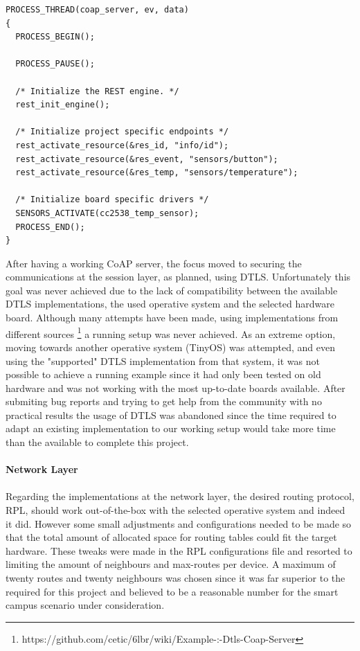\begin{lstlisting}[caption={CoAP Resources Activation}]
PROCESS_THREAD(coap_server, ev, data)
{
  PROCESS_BEGIN();

  PROCESS_PAUSE();

  /* Initialize the REST engine. */
  rest_init_engine();

  /* Initialize project specific endpoints */
  rest_activate_resource(&res_id, "info/id");
  rest_activate_resource(&res_event, "sensors/button");
  rest_activate_resource(&res_temp, "sensors/temperature");

  /* Initialize board specific drivers */
  SENSORS_ACTIVATE(cc2538_temp_sensor);
  PROCESS_END();
}
\end{lstlisting}

After having a working \gls{CoAP} server, the focus moved to securing the communications at the session layer, as planned, using \gls{DTLS}. Unfortunately this goal was never achieved due to the lack of compatibility between the available \gls{DTLS} implementations, the used operative system and the selected hardware board. Although many attempts have been made, using implementations from different sources \footnote{https://github.com/cetic/6lbr/wiki/Example-:-Dtls-Coap-Server} a running setup was never achieved. As an extreme option, moving towards another operative system (TinyOS) was attempted, and even using the "supported" \gls{DTLS} implementation from that system, it was not possible to achieve a running example since it had only been tested on old hardware and was not working with the most up-to-date boards available. After submiting bug reports and trying to get help from the community with no practical results the usage of \gls{DTLS} was abandoned since the time required to adapt an existing implementation to our working setup would take more time than the available to complete this project.

\paragraph{\textbf{Network Layer}}
\paragraph{}

Regarding the implementations at the network layer, the desired routing protocol, \gls{RPL}, should work out-of-the-box with the selected operative system and indeed it did. However some small adjustments and configurations needed to be made so that the total amount of allocated space for routing tables could fit the target hardware. These tweaks were made in the \gls{RPL} configurations file and resorted to limiting the amount of neighbours and max-routes per device. A maximum of twenty routes and twenty neighbours was chosen since it was far superior to the required for this project and believed to be a reasonable number for the smart campus scenario under consideration.

